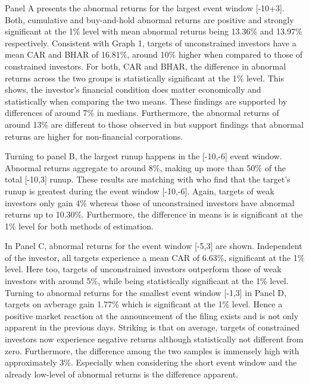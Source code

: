 \documentclass[12pt]{article}
\begin{document}
Panel A presents the abnormal returns for the largest event window [-10+3]. Both, cumulative and buy-and-hold abnormal returns are positive and strongly significant at the 1\% level with mean abnormal returns being 13.36\% and 13.97\% respectively. Consistent with Graph 1, targets of unconstrained investors have a mean CAR and BHAR of 16.81\%, around 10\% higher when compared to those of constrained investors. For both, CAR and BHAR, the difference in abnormal returns across the two groups is statistically significant at the 1\% level. This shows, the investor's financial condition does matter economically and statistically when comparing the two means. These findings are supported by differences of around 7\% in medians. Furthermore, the abnormal returns of around 13\% are different to those observed in \citet[p.208]{Klein2009} but support \citet[p.29]{Brigida2012} findings that abnormal returns are higher for non-financial corporations.

Turning to panel B, the largest runup happens in the [-10,-6] event window. Abnormal returns aggregate to around 8\%, making up more than 50\% of the total [-10,3] runup. These results are matching with \citet[p.32]{Brigida2012} who find that the target's runup is greatest during the event window [-10,-6]. Again, targets of weak investors only gain 4\% whereas those of unconstrained investors have abnormal returns up to 10.30\%. Furthermore, the difference in means is is significant at the 1\% level for both methods of estimation.




In Panel C, abnormal returns for the event window [-5,3] are shown. Independent of the investor, all targets experience a mean CAR of 6.63\%, significant at the 1\% level. Here too, targets of unconstrained investors outperform those of weak investors with around 5\%, while being statistically significant at the 1\% level.\\
Turning to abnormal returns for the smallest event window [-1,3] in Panel D, targets on avberage gain 1.77\% which is significant at the 1\% level. Hence a positive market reaction at the announcement of the filing exists and is not only apparent in the previous days. Striking is that on average, targets of constrained investors now experience negative returns although statistically not different from zero. Furthermore, the difference among the two samples is immensely high with approximately 3\%. Especially when considering the short event window and the already low-level of abnormal returns is the difference apparent.
\end{document}
